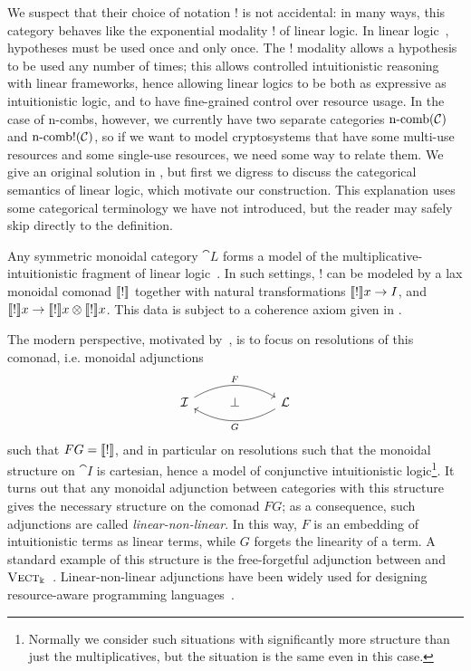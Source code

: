 We suspect that their choice of notation $!$
is not accidental: in many ways, this category behaves like the exponential
modality $!$ of linear logic. In linear logic~\cite{girard-1987}, hypotheses
must be used once and only once. The $!$ modality allows a hypothesis to be used
any number of times; this allows controlled intuitionistic reasoning with linear
frameworks, hence allowing linear logics to be both as expressive as intuitionistic
logic, and to have fine-grained control over resource usage. In the case of
n-combs, however, we currently have two separate categories $\operatorname*{n-comb}({\mathcal{C}})$
and $\operatorname*{n-comb!}({\mathcal{C}})$, so if we want to model cryptosystems that have some
multi-use resources and some single-use resources, we need some way to relate
them. We give an original solution in , but
first we digress to discuss the categorical semantics of linear logic, which
motivate our construction. This explanation uses some categorical terminology we
have not introduced, but the reader may safely skip directly to the definition.

Any symmetric monoidal category $\cat{L}$ forms a model of the
multiplicative-intuitionistic fragment of linear logic~\cite{mellies-2009}. In such
settings, $!$ can be modeled by a lax monoidal comonad $\llbracket ! \rrbracket$ together
with natural transformations $\llbracket ! \rrbracket x\to I$, and
$\llbracket ! \rrbracket x\to\llbracket ! \rrbracket x\otimes\llbracket ! \rrbracket x$. This data is subject to a
coherence axiom given in \cite[Equation 72]{mellies-2009}.

The modern perspective, motivated by~\cite{benton-1995}, is to focus on
resolutions of this comonad, i.e. monoidal adjunctions \[
  \begin{tikzcd}
    \cat{I}\ar[rr, bend left, "F"] & \bot & \cat{L}\ar[ll, bend left, "G"]
  \end{tikzcd}
\]such that $FG = \llbracket ! \rrbracket$, and in particular on resolutions such that the
monoidal structure on $\cat{I}$ is cartesian, hence a model of conjunctive
intuitionistic logic\footnote{
  Normally we consider such situations with significantly more structure than just
  the multiplicatives, but the situation is the same even in this case.
}. It turns out that any monoidal adjunction between categories with this
structure gives the necessary structure on the comonad $FG$; as a consequence,
such adjunctions are called \emph{linear-non-linear}. In this way, $F$ is an
embedding of intuitionistic terms as linear terms, while $G$ forgets the
linearity of a term. A standard example of this structure is the free-forgetful
adjunction between  and
${\textsc{\text{Vect}}}_\Bbbk$~\cite{valiron-zdancewic-2014}. Linear-non-linear adjunctions
have been widely used for designing resource-aware programming
languages~\cite{maf-2005,krishnaswami-2015,paykin-2018,lmz-2019}.

